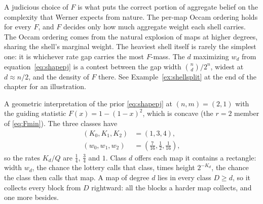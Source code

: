 \documentclass[11pt]{article}
\begin{document}
A judicious choice of $F$ is what puts the correct portion of
aggregate belief on the complexity that Werner expects from nature.
The per-map Occam ordering holds for every $F$, and $F$ decides
only how much aggregate weight each shell carries. The Occam ordering comes 
from the natural explosion of maps at higher degrees, sharing the shell's marginal weight.
The heaviest shell itself is rarely the simplest one: it is whichever
rate gap carries the most $F$-mass. The $d$ maximizing
$w_d$ from equation~\eqref{eq:shapepj} is a contest between the gap width
$\binom nd/2^n$, widest at $d \approx n/2$, and the density of $F$
there. See Example~\ref{ex:shellsplit} at the end of the chapter
for an illustration.

\begin{example}
A geometric interpretation of the prior \eqref{eq:shapepj} at $(n,m) = (2,1)$ with the guiding
statistic $F(x) = 1-(1-x)^2$, which is concave (the $r = 2$ member of \eqref{eq:Fmin}).
The three classes have
%
\begin{align*}
  (K_0, K_1, K_2) &= (1, 3, 4), \\
  (w_0, w_1, w_2) &= (\tfrac7{16}, \tfrac12, \tfrac1{16}),
\end{align*}
%
so the rates $K_d/Q$ are $\tfrac14$, $\tfrac34$ and $1$. Class $d$
offers each map it contains a rectangle: width $w_d$, the chance the lottery calls that
class, times height $2^{-K_d}$, the chance the class then calls that map.
A map of degree $d$ lies in every class $D \ge d$, so it collects
every block from $D$ rightward: all the blocks a harder map
collects, and one more besides.


\end{example}
\end{document}
